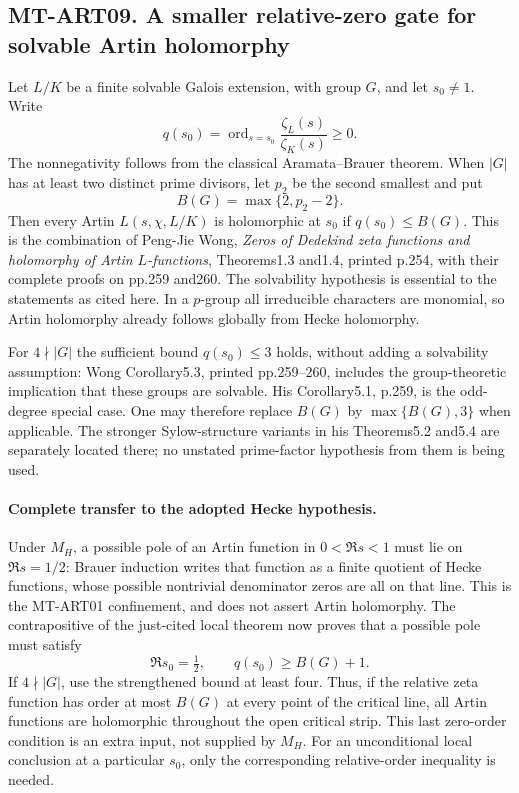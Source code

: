 \subsection*{MT-ART09. A smaller relative-zero gate for solvable Artin holomorphy}

Let $L/K$ be a finite solvable Galois extension, with group $G$,
and let $s_0\ne1$. Write
\[
 q(s_0)=\operatorname{ord}_{s=s_0}
             \frac{\zeta_L(s)}{\zeta_K(s)}\ge0.
\]
The nonnegativity follows from the classical Aramata--Brauer
theorem. When $|G|$ has at least two distinct prime divisors,
let $p_2$ be the second smallest and put
\[
                 B(G)=\max\{2,p_2-2\}.
\]
Then every Artin $L(s,\chi,L/K)$ is holomorphic at $s_0$ if
$q(s_0)\le B(G)$. This is the combination of Peng-Jie Wong,
\emph{Zeros of Dedekind zeta functions and holomorphy of Artin
$L$-functions}, Theorems1.3 and1.4, printed p.254, with their
complete proofs on pp.259 and260. The solvability hypothesis
is essential to the statements as cited here. In a $p$-group
all irreducible characters are monomial, so Artin holomorphy
already follows globally from Hecke holomorphy.

For $4\nmid |G|$ the sufficient bound $q(s_0)\le3$ holds,
without adding a solvability assumption: Wong Corollary5.3,
printed pp.259--260, includes the group-theoretic implication
that these groups are solvable. His Corollary5.1, p.259, is the
odd-degree special case. One may therefore replace $B(G)$ by
$\max\{B(G),3\}$ when applicable. The stronger Sylow-structure
variants in his Theorems5.2 and5.4 are separately located there;
no unstated prime-factor hypothesis from them is being used.

\paragraph{Complete transfer to the adopted Hecke hypothesis.}
Under $M_H$, a possible pole of an Artin function in
$0<\Re s<1$ must lie on $\Re s=1/2$: Brauer induction writes
that function as a finite quotient of Hecke functions, whose
possible nontrivial denominator zeros are all on that line.
This is the MT-ART01 confinement, and does not assert Artin
holomorphy. The contrapositive of the just-cited local theorem
now proves that a possible pole must satisfy
\[
 \Re s_0=\tfrac12,\qquad q(s_0)\ge B(G)+1.
 \tag{MT-ART09a}
\]
If $4\nmid |G|$, use the strengthened bound at least four.
Thus, if the relative zeta function has order at most $B(G)$
at every point of the critical line, all Artin functions are
holomorphic throughout the open critical strip. This last
zero-order condition is an extra input, not supplied by $M_H$.
For an unconditional local conclusion at a particular $s_0$,
only the corresponding relative-order inequality is needed.

